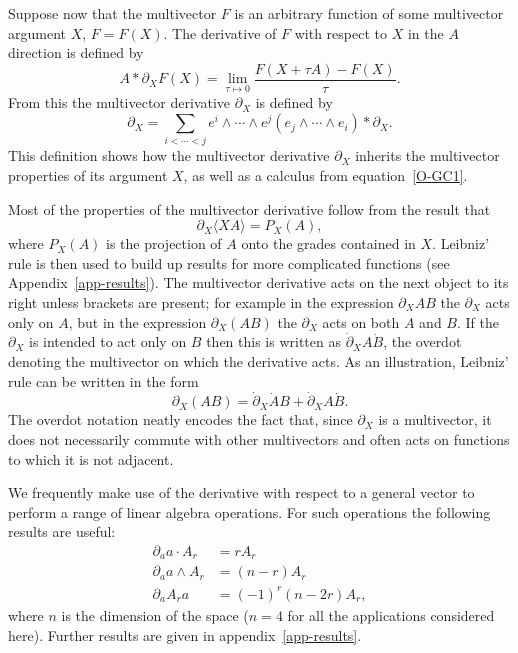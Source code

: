 \documentclass[a4paper]{article}
\numberwithin{equation}{section}
\newcommand{\dt}{\! \cdot \!}
\newcommand{\wdg}{\! \wedge \!}
\newcommand{\scp}{\! \ast \!}
\newcommand{\la}{\langle}
\newcommand{\ra}{\rangle}
\newcommand{\eqv}{=}
\newcommand{\da}{\partial_a}
\newcommand{\dX}{\partial_X}
\begin{document}
Suppose now that the multivector $F$ is an arbitrary function of some
multivector argument $X$, $F=F(X)$.  The derivative of $F$ with
respect to $X$ in the $A$ direction is defined by
%
\begin{equation}
A \scp \dX F(X) \eqv \lim_{\tau \mapsto 0} \frac{F(X+ \tau A)
-F(X)}{\tau}.
\label{O-GC1}
\end{equation}
%
From this the multivector derivative $\dX$ is defined by
%
\begin{equation}
\dX \eqv \sum_{i < \cdots < j} e^i \wdg \cdots \wdg e^j  (e_j \wdg
\cdots \wdg e_i) \scp \dX .
\label{O-GC2}
\end{equation}
%
This definition shows how the multivector derivative $\dX$ inherits
the multivector properties of its argument $X$, as well as a calculus
from equation~\eqref{O-GC1}.


Most of the properties of the multivector derivative follow from the
result that
%
\begin{equation} 
\dX \la X A \ra = P_{X}(A) ,
\end{equation}
%
where $ P_{X}(A)$ is the projection of $A$ onto the grades contained
in $X$.  Leibniz' rule is then used to build up results for more
complicated functions (see Appendix~\ref{app-results}).  The
multivector derivative acts on the next object to its right unless
brackets are present; for example in the expression $\dX AB$ the $\dX$
acts only on $A$, but in the expression $\dX (AB)$ the $\dX$ acts on
both $A$ and $B$.  If the $\dX$ is intended to act only on $B$ then
this is written as $\dot{\partial}_X A\dot{B}$, the overdot
denoting the multivector on which the derivative acts.  As an
illustration, Leibniz' rule can be written in the form
%
\begin{equation}
\dX (AB) =  \dot{\partial}_X \dot{A} B + \dot{\partial}_X A \dot{B}.
\end{equation}
%
The overdot notation neatly encodes the fact that, since $\dX$ is a
multivector, it does not necessarily commute with other multivectors
and often acts on functions to which it is not adjacent.



We frequently make use of the derivative with respect to a general
vector to perform a range of linear algebra operations.  For such
operations the following results are useful:
%
\begin{align}
\da a \dt A_r &= r A_r \\
\da a \wdg A_r &= (n-r) A_r \\
\da A_r a &= (-1)^r (n-2r) A_r, \label{O-gc5}
\end{align} 
%
where $n$ is the dimension of the space ($n=4$ for all the
applications considered here).  Further results are given in
appendix~\ref{app-results}. 
\end{document}
